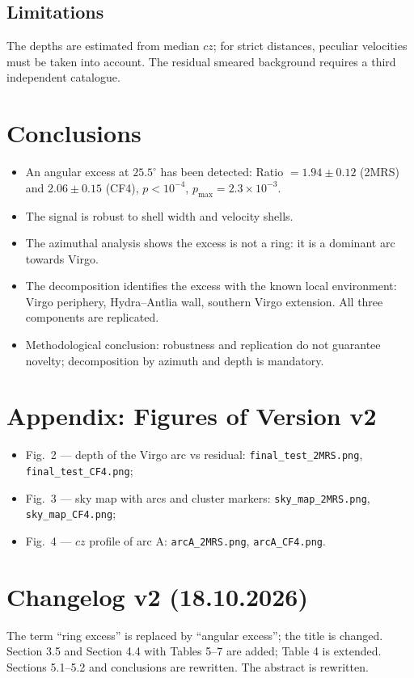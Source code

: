 \documentclass[11pt,a4paper]{article}
\begin{document}
\subsection{Limitations}
The depths are estimated from median \(cz\); for strict distances, peculiar velocities must be taken into account. The residual smeared background requires a third independent catalogue.

\section{Conclusions}
\begin{itemize}
\item An angular excess at \(25.5^\circ\) has been detected: Ratio \(= 1.94 \pm 0.12\) (2MRS) and \(2.06 \pm 0.15\) (CF4), \(p < 10^{-4}\), \(p_{\max} = 2.3 \times 10^{-3}\).
\item The signal is robust to shell width and velocity shells.
\item The azimuthal analysis shows the excess is not a ring: it is a dominant arc towards Virgo.
\item The decomposition identifies the excess with the known local environment: Virgo periphery, Hydra--Antlia wall, southern Virgo extension. All three components are replicated.
\item Methodological conclusion: robustness and replication do not guarantee novelty; decomposition by azimuth and depth is mandatory.
\end{itemize}

\section*{Appendix: Figures of Version v2}
\begin{itemize}
\item Fig.~2 --- depth of the Virgo arc vs residual: \texttt{final\_test\_2MRS.png}, \texttt{final\_test\_CF4.png};
\item Fig.~3 --- sky map with arcs and cluster markers: \texttt{sky\_map\_2MRS.png}, \texttt{sky\_map\_CF4.png};
\item Fig.~4 --- \(cz\) profile of arc A: \texttt{arcA\_2MRS.png}, \texttt{arcA\_CF4.png}.
\end{itemize}

\section*{Changelog v2 (18.10.2026)}
The term ``ring excess'' is replaced by ``angular excess''; the title is changed. Section 3.5 and Section 4.4 with Tables 5--7 are added; Table 4 is extended. Sections 5.1--5.2 and conclusions are rewritten. The abstract is rewritten.
\end{document}
